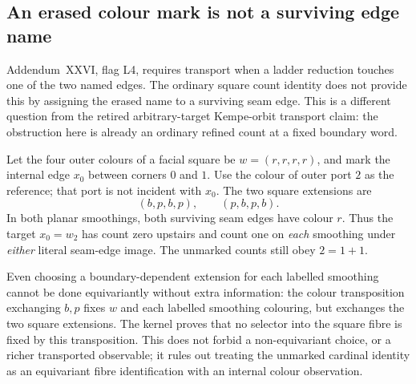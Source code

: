 \subsection{An erased colour mark is not a surviving edge name}
\label{sec:marked-square-observable}

Addendum~XXVI, flag L4, requires transport when a ladder reduction touches
one of the two named edges.  The ordinary square count identity does not
provide this by assigning the erased name to a surviving seam edge.
This is a different question from the retired arbitrary-target
Kempe-orbit transport claim: the obstruction here is already an ordinary
refined count at a fixed boundary word.

Let the four outer colours of a facial square be
$w=(r,r,r,r)$, and mark the internal edge $x_0$ between corners $0$ and $1$.
Use the colour of outer port $2$ as the reference; that port is not incident
with $x_0$.  The two square extensions are
\[
             (b,p,b,p),\qquad(p,b,p,b).
\]
In both planar smoothings, both surviving seam edges have colour $r$.
Thus the target $x_0=w_2$ has count zero upstairs and count one on
\emph{each} smoothing under \emph{either} literal seam-edge image.
The unmarked counts still obey $2=1+1$.

Even choosing a boundary-dependent extension for each labelled smoothing
cannot be done equivariantly without extra information: the colour
transposition exchanging $b,p$ fixes $w$ and each labelled smoothing
colouring, but exchanges the two square extensions.  The kernel proves
that no selector into the square fibre is fixed by this transposition.
This does not forbid a non-equivariant choice, or a richer transported
observable; it rules out treating the unmarked cardinal identity as an
equivariant fibre identification with an internal colour observation.

